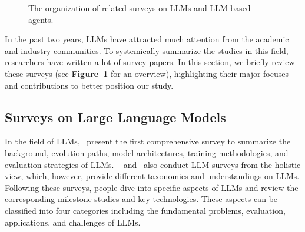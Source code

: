 \documentclass{article}
\theoremstyle{definition}
\theoremstyle{theorem}
\theoremstyle{proof}
\theoremstyle{remark}
\begin{document}
\begin{figure}[p]
		\vspace{0.5cm}
		\caption{The organization of related surveys on LLMs and LLM-based agents.}
		\vspace{-0.2cm}
		\label{fig:related_agent}
	\end{figure}
	
	In the past two years, LLMs have attracted much attention from the academic and industry communities. To systemically summarize the studies in this field, researchers have written a lot of survey papers. In this section, we briefly review these surveys (see \textbf{Figure~\ref{fig:related_agent}} for an overview), highlighting their major focuses and contributions to better position our study.
	
	
	\subsection{Surveys on Large Language Models} 
	
	In the field of LLMs,~\citet{survey_llm1} present the first comprehensive survey to summarize the background, evolution paths, model architectures, training methodologies, and evaluation strategies of LLMs. 
	~\citet{survey_llm2} and~\citet{survey_llm3} also conduct LLM surveys from the holistic view, which, however, provide different taxonomies and understandings on LLMs.
	Following these surveys, people dive into specific aspects of LLMs and review the corresponding milestone studies and key technologies. 
	These aspects can be classified into four categories including the fundamental problems, evaluation, applications, and challenges of LLMs. 
	
\end{document}
